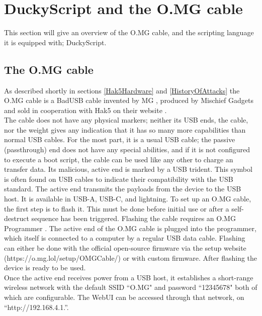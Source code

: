 \section{DuckyScript and the O.MG cable}


This section will give an overview of the O.MG cable, and the scripting language it is equipped with; DuckyScript. 

\subsection{The O.MG cable} \label{theOMGCable}

As described shortly in sections \ref{Hak5Hardware} and \ref{HistoryOfAttacks} the O.MG cable is a BadUSB cable invented by MG \cite{MGCable2019a}, produced by Mischief Gadgets \cite{hak5MischiefGadgets} and sold in cooperation with Hak5 on their website \cite{hak5MischiefGadgets}. \\
The cable does not have any physical markers; neither its USB ends, the cable, nor the weight gives any indication that it has so many more capabilities than normal USB cables. For the most part, it is a usual USB cable; the passive (passthrough) end does not have any special abilities, and if it is not configured to execute a boot script, the cable can be used like any other to charge an transfer data. Its malicious, active end is marked by a USB trident. This symbol is often found on USB cables to indicate their compatibility with the USB standard. The active end transmits the payloads from the device to the USB host. It is available in USB-A, USB-C, and lightning. 
To set up an O.MG cable, the first step is to flash it. This must be done before initial use or after a self-destruct sequence has been triggered. Flashing the cable requires an O.MG Programmer \cite{hak5MGCable}. The active end of the O.MG cable is plugged into the programmer, which itself is connected to a computer by a regular USB data cable. Flashing can either be done with the official open-source firmware \cite{DuckyScriptSyntaxGuide} via the setup website (https://o.mg.lol/setup/OMGCable/) or with custom firmware. After flashing the device is ready to be used. \\  
Once the active end receives power from a USB host, it establishes a short-range wireless network with the default SSID ``O.MG" and password ``12345678" both of which are configurable. The WebUI can be accessed through that network, on ``http://192.168.4.1.''. \\

